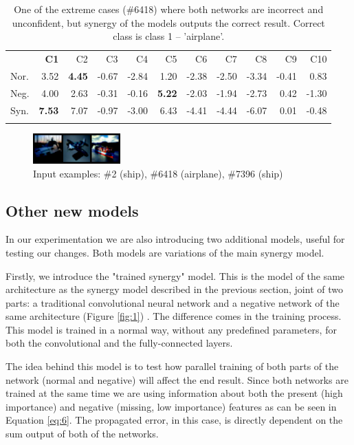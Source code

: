 \documentclass[b5paper]{book}
\begin{document}
\begin{table}
\centering
\caption{One of the extreme cases (\#6418) where both networks are incorrect and unconfident, but synergy of the models outputs the correct result. Correct class is class 1 -- 'airplane'.}
\label{tab:5}
\tabcolsep=0.06cm
\begin{tabular}{lrrrrrrrrrr}
\hline\noalign{\smallskip}
 & \textbf{C1} & C2 & C3 & C4 & C5 & C6 & C7 & C8 & C9 & C10 \\
\noalign{\smallskip}\hline\noalign{\smallskip}
Nor. & 3.52 & \textbf{4.45} & -0.67 & -2.84 & 1.20 & -2.38 & -2.50 & -3.34 & -0.41 & 0.83 \\
Neg. & 4.00 & 2.63 & -0.31 & -0.16 & \textbf{5.22} & -2.03 & -1.94 & -2.73 & 0.42 & -1.30 \\
Syn. & \textbf{7.53} & 7.07 & -0.97 & -3.00 & 6.43 & -4.41 & -4.44 & -6.07 & 0.01 & -0.48 \\
\noalign{\smallskip}\hline
\end{tabular}
\end{table}

\begin{figure}
    \centering
    \includegraphics[width=0.3\textwidth]{figures/fig2.png}
\caption{Input examples: \#2 (ship), \#6418 (airplane), \#7396 (ship)}
\label{fig:2} 
\end{figure}

\subsection{Other new models}
\label{other new models}

In our experimentation we are also introducing two additional models, useful for testing our changes. Both models are variations of the main synergy model.

Firstly, we introduce the "trained synergy" model. This is the model of the same architecture as the synergy model described in the previous section, joint of two parts: a traditional convolutional neural network and a negative network of the same architecture (Figure \ref{fig:1}) . The difference comes in the training process. This model is trained in a normal way, without any predefined parameters, for both the convolutional and the fully-connected layers. 

The idea behind this model is to test how parallel training of both parts of the network (normal and negative) will affect the end result. Since both networks are trained at the same time we are using information about both the present (high importance) and negative (missing, low importance) features as can be seen in Equation \ref{eq:6}. The propagated error, in this case, is directly dependent on the sum output of both of the networks. 
\end{document}
